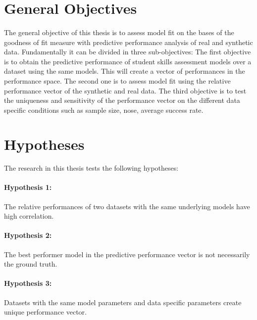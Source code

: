 \section{General Objectives}

\paragraph{}The general objective of this thesis is to assess model fit on the bases of the goodness of fit measure with predictive performance analysis of real and synthetic data. Fundamentally it can be divided in three sub-objectives: The first objective is to obtain the predictive performance of student skills assessment models over a dataset using the same models. This will create a vector of performances in the performance space. The second one is to assess model fit using the relative performance vector of the synthetic and real data. The third objective is to test the uniqueness and sensitivity of the performance vector on the different data specific conditions such as sample size, nose, average success rate.

\section{Hypotheses}
\paragraph{}The research in this thesis tests the following hypotheses:
\paragraph{Hypothesis 1:} The relative performances of two datasets with the same underlying models have high correlation.
\paragraph{Hypothesis 2:} The best performer model in the predictive performance vector is not necessarily the ground truth.
\paragraph{Hypothesis 3:} Datasets with the same model parameters and data specific parameters create unique performance vector.  
